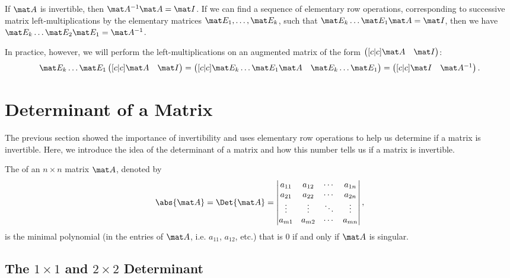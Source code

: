 \begin{recipe}
    If $\mat A$ is invertible, then $\mat A^{-1} \mat A = \mat I$. If we can find a sequence of elementary row operations, corresponding to successive matrix left-multiplications by the elementary matrices $\mat E_1, \dots, \mat E_k$, such that $\mat E_k \dots \mat E_1 \mat A = \mat I$, then we have $\mat E_k \dots \mat E_2 \mat E_1 = \mat A^{-1}$.
\end{recipe}

In practice, however, we will perform the left-multiplications on an augmented matrix of the form $\begin{pmatrix}[c|c] \mat A & \mat I\end{pmatrix}$: \[\mat E_k \dots \mat E_1 \begin{pmatrix}[c|c] \mat A & \mat I\end{pmatrix} = \begin{pmatrix}[c|c] \mat E_k \dots \mat E_1 \mat A & \mat E_k \dots \mat E_1\end{pmatrix} = \begin{pmatrix}[c|c]\mat I & \mat A^{-1}\end{pmatrix}.\]

\section{Determinant of a Matrix}

The previous section showed the importance of invertibility and uses elementary row operations to help us determine if a matrix is invertible. Here, we introduce the idea of the determinant of a matrix and how this number tells us if a matrix is invertible.

\begin{definition}
    The  of an $n \times n$ matrix $\mat A$, denoted by \[\abs{\mat A} = \Det{\mat A} = \begin{vmatrix}a_{11} & a_{12} & \cdots & a_{1n} \\ a_{21} & a_{22} & \cdots & a_{2n} \\ \vdots & \vdots & \ddots & \vdots \\ a_{m1} & a_{m2} & \cdots & a_{mn} \end{vmatrix},\] is the minimal polynomial (in the entries of $\mat A$, i.e. $a_{11}$, $a_{12}$, etc.) that is 0 if and only if $\mat A$ is singular.
\end{definition}

\subsection{The \texorpdfstring{$1 \times 1$}{1 x 1} and \texorpdfstring{$2 \times 2$}{2 x 2} Determinant}

